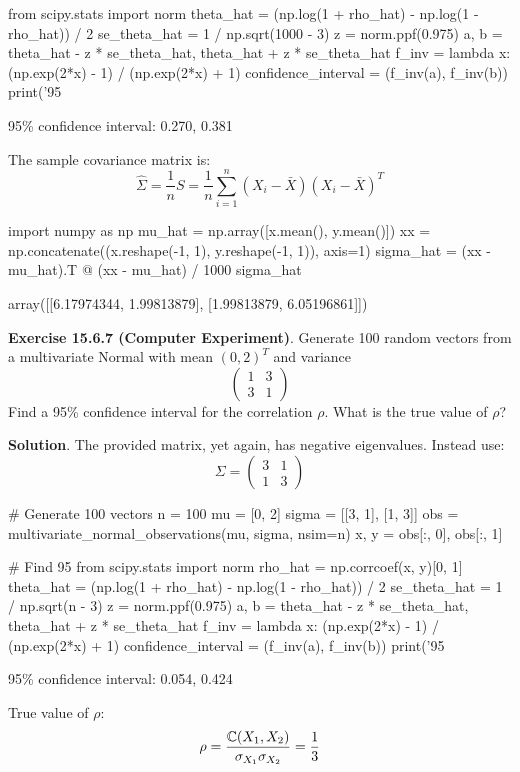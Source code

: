 \begin{python}
from scipy.stats import norm
theta_hat = (np.log(1 + rho_hat) - np.log(1 - rho_hat)) / 2
se_theta_hat = 1 / np.sqrt(1000 - 3)
z = norm.ppf(0.975)
a, b = theta_hat - z * se_theta_hat, theta_hat + z * se_theta_hat
f_inv = lambda x: (np.exp(2*x) - 1) / (np.exp(2*x) + 1)
confidence_interval = (f_inv(a), f_inv(b))
print('95%
\end{python}
\begin{console}
95\% confidence interval: 0.270, 0.381
\end{console}
The sample covariance matrix is:
\[
\hat{\Sigma} = \frac{1}{n} S = \frac{1}{n} \sum_{i=1}^{n} (X_{i} - \bar{X})(X_{i} - \bar{X})^T
\]

\begin{python}
import numpy as np
mu_hat = np.array([x.mean(), y.mean()])
xx = np.concatenate((x.reshape(-1, 1), y.reshape(-1, 1)), axis=1)
sigma_hat = (xx - mu_hat).T @ (xx - mu_hat) / 1000
sigma_hat
\end{python}
\begin{console}
array([[6.17974344, 1.99813879],
       [1.99813879, 6.05196861]])
\end{console}

\textbf{Exercise 15.6.7 (Computer Experiment)}. Generate 100 random
vectors from a multivariate Normal with mean \((0, 2)^T\) and variance
\[
\begin{pmatrix}
1 & 3 \\
3 & 1
\end{pmatrix}
\]
Find a 95\% confidence interval for the correlation \(\rho\). What is
the true value of \(\rho\)?

\textbf{Solution}.
The provided matrix, yet again, has negative eigenvalues. Instead
use:
\[
\Sigma = \begin{pmatrix}
3 & 1 \\
1 & 3
\end{pmatrix}
\]

\begin{python}
# Generate 100 vectors
n = 100
mu = [0, 2]
sigma = [[3, 1], [1, 3]]
obs = multivariate_normal_observations(mu, sigma, nsim=n)
x, y = obs[:, 0], obs[:, 1]
\end{python}

\begin{python}
# Find 95%
from scipy.stats import norm
rho_hat = np.corrcoef(x, y)[0, 1]
theta_hat = (np.log(1 + rho_hat) - np.log(1 - rho_hat)) / 2
se_theta_hat = 1 / np.sqrt(n - 3)
z = norm.ppf(0.975)
a, b = theta_hat - z * se_theta_hat, theta_hat + z * se_theta_hat
f_inv = lambda x: (np.exp(2*x) - 1) / (np.exp(2*x) + 1)
confidence_interval = (f_inv(a), f_inv(b))
print('95%
\end{python}
\begin{console}
95\% confidence interval: 0.054, 0.424
\end{console}
True value of \(\rho\):
\[
\rho = \frac{\operatorname{\mathbb{C}}(X_{1}, X_{2})}{\sigma_{X_{1}} \sigma_{X_{2}}} = \frac{1}{3}
\]
